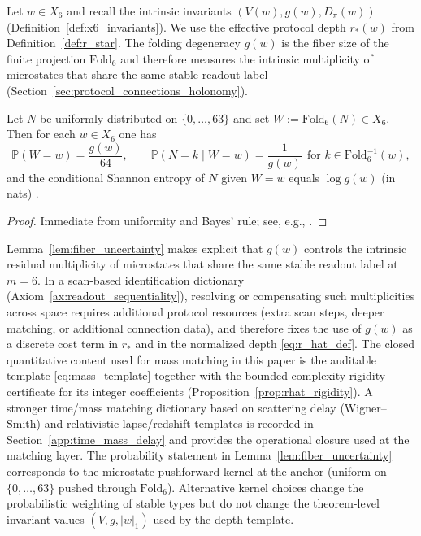 Let $w\in X_6$ and recall the intrinsic invariants $(V(w),g(w),D_\pi(w))$ (Definition~\ref{def:x6_invariants}).
We use the effective protocol depth $r_\ast(w)$ from Definition~\ref{def:r_star}.
The folding degeneracy $g(w)$ is the fiber size of the finite projection $\mathrm{Fold}_6$ and therefore measures the intrinsic multiplicity of microstates that share the same stable readout label (Section~\ref{sec:protocol_connections_holonomy}).

\begin{lemma}\label{lem:fiber_uncertainty}
Let $N$ be uniformly distributed on $\{0,\dots,63\}$ and set $W:=\mathrm{Fold}_6(N)\in X_6$.
Then for each $w\in X_6$ one has
\[
\mathbb{P}(W=w)=\frac{g(w)}{64},
\qquad
\mathbb{P}(N=k\mid W=w)=\frac{1}{g(w)}\ \ \text{for }k\in \mathrm{Fold}_6^{-1}(w),
\]
and the conditional Shannon entropy of $N$ given $W=w$ equals $\log g(w)$ (in nats) \cite{Shannon1948,CoverThomas2006}.
\end{lemma}
\begin{proof}
Immediate from uniformity and Bayes' rule; see, e.g., \cite{CoverThomas2006}.
\end{proof}

\begin{remark}\label{rem:mass_as_scan_density}
Lemma~\ref{lem:fiber_uncertainty} makes explicit that $g(w)$ controls the intrinsic residual multiplicity of microstates that share the same stable readout label at $m=6$.
In a scan-based identification dictionary (Axiom~\ref{ax:readout_sequentiality}), resolving or compensating such multiplicities across space requires additional protocol resources (extra scan steps, deeper matching, or additional connection data), and therefore fixes the use of $g(w)$ as a discrete cost term in $r_\ast$ and in the normalized depth \eqref{eq:r_hat_def}.
The closed quantitative content used for mass matching in this paper is the auditable template \eqref{eq:mass_template} together with the bounded-complexity rigidity certificate for its integer coefficients (Proposition~\ref{prop:rhat_rigidity}).
A stronger time/mass matching dictionary based on scattering delay (Wigner--Smith) and relativistic lapse/redshift templates is recorded in Section~\ref{app:time_mass_delay} and provides the operational closure used at the matching layer.
\AuditTag The probability statement in Lemma~\ref{lem:fiber_uncertainty} corresponds to the microstate-pushforward kernel at the anchor (uniform on $\{0,\dots,63\}$ pushed through $\mathrm{Fold}_6$).
Alternative kernel choices change the probabilistic weighting of stable types but do not change the theorem-level invariant values $(V,g,|w|_1)$ used by the depth template.
\end{remark}


